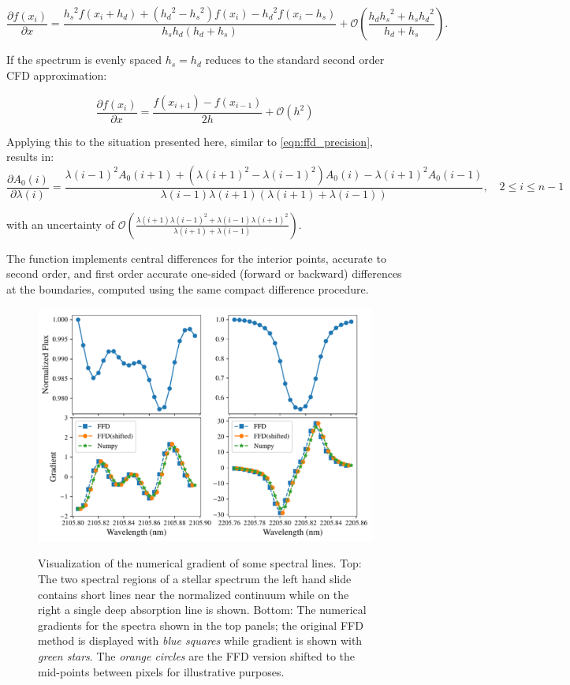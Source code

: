 \[\frac{\partial{f(x_i)}}{\partial{x}} = \frac{{h_{s}}^{2}f\left(x_{i} + {h_{d}}\right) + \left({h_{d}}^{2} - {h_{s}}^{2}\right)f\left(x_{i}\right) - {h_{d}}^{2}f\left(x_{i}-{h_{s}}\right)} {{h_{s}}{h_{d}}\left({h_{d}} + {h_{s}}\right)} + \mathcal{O}\left(\frac{h_{d}{h_{s}}^{2} + {h_{s}}{h_{d}}^{2}}{{h_{d}} + {h_{s}}}\right) \label{eqn:full_compact_difference}.\]

If the spectrum is evenly spaced ${h_{s}}={h_{d}}$  reduces to the standard second order {CFD} approximation:

\[\frac{\partial{f(x_i)}}{\partial{x}} = \frac{f\left(x_{i+1}\right) - f\left(x_{i-1}\right)}{2h} + \mathcal{O}\left({h}^{2}\right)\]

Applying this to the situation presented here, similar to \cref{eqn:ffd_precision}, results in:
\[\frac{\partial {A}_{0}(i)}{\partial\lambda(i)} = \frac{{\lambda(i-1)}^{2} {A}_{0}(i+1) + ({\lambda(i+1)}^{2}-{\lambda(i-1)}^{2}) {A}_{0}(i) - {\lambda(i+1)}^{2} {A}_{0}(i-1)} {\lambda(i-1)\lambda(i+1)(\lambda(i+1) + \lambda(i-1))}, \hspace{1em} 2 \leq i \leq n-1\]

with an uncertainty of \(\mathcal{O}\left(\frac{\lambda(i+1){\lambda(i-1)}^{2} + \lambda(i-1){\lambda(i+1)}^{2}}{\lambda(i+1) + \lambda(i-1)}\right)\).

The \npgradient{} function implements central differences for the interior points, accurate to second order, and first order accurate one-sided (forward or backward) differences at the boundaries, computed using the same compact difference procedure.

\begin{figure}
    \centering
    \includegraphics[width=0.85\linewidth]{figures/information-content/spectral_gradients}\\
    \caption[Comparing of numerical gradient alogithms.]{Visualization of the numerical gradient of some spectral lines.
        Top: The two spectral regions of a stellar spectrum the left hand slide contains short lines near the normalized continuum while on the right a single deep absorption line is shown.
        Bottom: The numerical gradients for the spectra shown in the top panels; the original {FFD} method is displayed with \emph{blue squares} while \numpy{} gradient is shown with \emph{green stars}.
        The \emph{orange circles} are the {FFD} version shifted to the mid-points between pixels for illustrative purposes.}
    \label{fig:gradients}
\end{figure}


